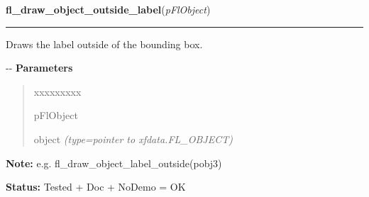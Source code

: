 \hspace{.8\funcindent}\begin{boxedminipage}{\funcwidth}

    \raggedright \textbf{fl\_draw\_object\_outside\_label}(\textit{pFlObject})

    \vspace{-1.5ex}

    \rule{\textwidth}{0.5\fboxrule}
\setlength{\parskip}{2ex}

Draws the label outside of the bounding box.

-{}-
\setlength{\parskip}{1ex}
      \textbf{Parameters}
      \vspace{-1ex}

      \begin{quote}
        \begin{Ventry}{xxxxxxxxx}

          \item[pFlObject]


object
            {\it (type=pointer to xfdata.FL\_OBJECT)}

        \end{Ventry}

      \end{quote}

\textbf{Note:} 
e.g. fl\_draw\_object\_label\_outside(pobj3)


\textbf{Status:} 
Tested + Doc + NoDemo = OK


    \end{boxedminipage}

    \label{xformslib:flbasic:fl_get_object_component}

    \vspace{0.5ex}

